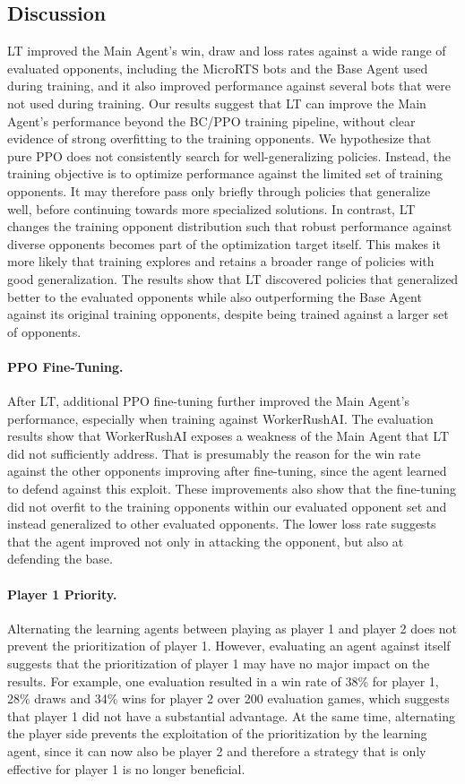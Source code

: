 \documentclass[10pt,twocolumn,letterpaper]{article}
\begin{document}
\subsection{Discussion}
LT improved the Main Agent’s win, draw and loss rates against a wide range of evaluated opponents, including the MicroRTS bots and the Base Agent used during training, and it also improved performance against several bots that were not used during training.
Our results suggest that LT can improve the Main Agent’s performance beyond the BC/PPO training pipeline, without clear evidence of strong overfitting to the training opponents.
We hypothesize that pure PPO does not consistently search for well-generalizing policies.
Instead, the training objective is to optimize performance against the limited set of training opponents.
It may therefore pass only briefly through policies that generalize well, before continuing towards more specialized solutions.
In contrast, LT changes the training opponent distribution such that robust performance against diverse opponents becomes part of the optimization target itself.
This makes it more likely that training explores and retains a broader range of policies with good generalization.
The results show that LT discovered policies that generalized better to the evaluated opponents while also outperforming the Base Agent against its original training opponents, despite being trained against a larger set of opponents.


\paragraph{PPO Fine-Tuning.}
After LT, additional PPO fine-tuning further improved the Main Agent’s performance, especially when training against WorkerRushAI.
The evaluation results show that WorkerRushAI exposes a weakness of the Main Agent that LT did not sufficiently address.
That is presumably the reason for the win rate against the other opponents improving after fine-tuning, since the agent learned to defend against this exploit.
These improvements also show that the fine-tuning did not overfit to the training opponents within our evaluated opponent set and instead generalized to other evaluated opponents.
The lower loss rate suggests that the agent improved not only in attacking the opponent, but also at defending the base.


\paragraph{Player 1 Priority.}
Alternating the learning agents between playing as player 1 and player 2 does not prevent the prioritization of player 1.
However, evaluating an agent against itself suggests that the prioritization of player 1 may have no major impact on the results.
For example, one evaluation resulted in a win rate of 38\% for player 1, 28\% draws and 34\% wins for player 2 over 200 evaluation games, which suggests that player 1 did not have a substantial advantage.
At the same time, alternating the player side prevents the exploitation of the prioritization by the learning agent, since it can now also be player 2 and therefore a strategy that is only effective for player 1 is no longer beneficial.
\end{document}
